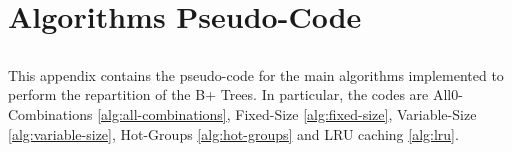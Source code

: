 \documentclass[mscthesis,12pt]{usiinfthesis}
\begin{document}






\appendix %
\chapter{Algorithms Pseudo-Code}
\section{}
This appendix contains the pseudo-code for the main algorithms implemented to perform the repartition of the B+ Trees. In particular, the codes are All0-Combinations \ref{alg:all-combinations}, Fixed-Size \ref{alg:fixed-size}, Variable-Size \ref{alg:variable-size}, Hot-Groups \ref{alg:hot-groups} and LRU caching \ref{alg:lru}.
\end{document}
